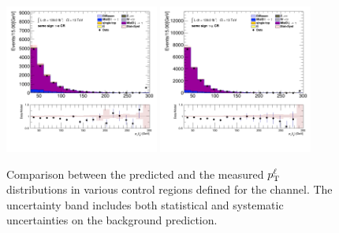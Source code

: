 \begin{figure}[!htp]
\begin{center}
			\includegraphics[width=0.45\textwidth]{chapters/chapter6_HPlus/images/taulep/lep_0_pt_SS_TAUEL.png} 
			\includegraphics[width=0.45\textwidth]{chapters/chapter6_HPlus/images/taulep/lep_0_pt_SS_TAUMU.png} \\
			\end{center}
			\caption{
			Comparison between the predicted and the measured $p_{\text{T}}^{\ell}$ distributions in various control regions defined for the \taulep channel. The uncertainty band includes both statistical and systematic uncertainties on the background prediction. 
			}
			\label{fig:bkg-pt-lep-taulep}
		\end{figure}

